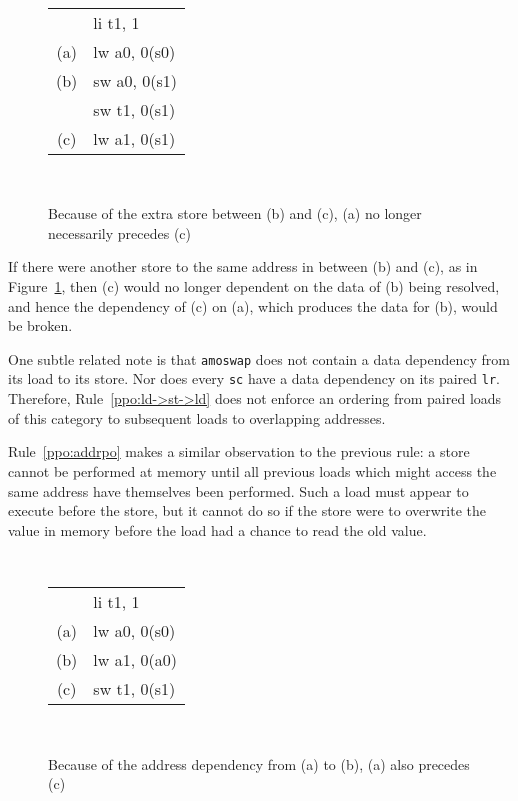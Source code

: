 \begin{figure}[h!]
  \centering
  {
    \tt\small
    \begin{tabular}{cl}
          & li t1, 1       \\
      (a) & lw a0, 0(s0)   \\
      (b) & sw a0, 0(s1)   \\
          & sw t1, 0(s1)   \\
      (c) & lw a1, 0(s1)   \\
    \end{tabular}
  }
  ~~~~
  \diagram
  \caption{Because of the extra store between (b) and (c), (a) no longer necessarily precedes (c)}
  \label{fig:litmus:addrdatarfi_no}
\end{figure}

If there were another store to the same address in between (b) and (c), as in Figure~\ref{fig:litmus:addrdatarfi_no}, then (c) would no longer dependent on the data of (b) being resolved, and hence the dependency of (c) on (a), which produces the data for (b), would be broken.

One subtle related note is that {\tt amoswap} does not contain a data dependency from its load to its store.  Nor does every {\tt sc} have a data dependency on its paired {\tt lr}.
Therefore, Rule~\ref{ppo:ld->st->ld} does not enforce an ordering from paired loads of this category to subsequent loads to overlapping addresses.

Rule~\ref{ppo:addrpo} makes a similar observation to the previous rule: a store cannot be performed at memory until all previous loads which might access the same address have themselves been performed.
Such a load must appear to execute before the store, but it cannot do so if the store were to overwrite the value in memory before the load had a chance to read the old value.

\begin{figure}[h!]
  \centering
  {
    \tt\small
    \begin{tabular}{cl}
        & li t1, 1       \\
    (a) & lw a0, 0(s0)   \\
    (b) & lw a1, 0(a0)   \\
    (c) & sw t1, 0(s1)   \\
    \end{tabular}
  }
  ~~~~
  \diagram
  \caption{Because of the address dependency from (a) to (b), (a) also precedes (c)}
  \label{fig:litmus:addrpo}
\end{figure}

